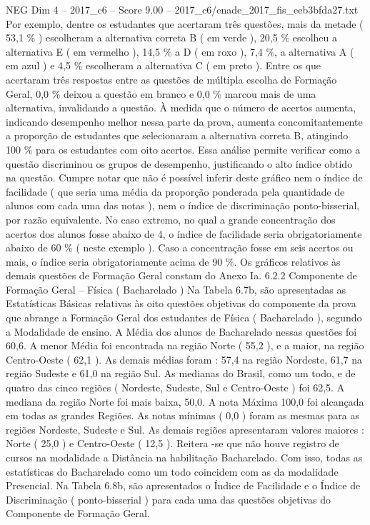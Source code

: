 \begin{textsample}{NEG Dim 4 – 2017\_c6 – Score 9.00 – 2017\_c6/enade\_2017\_fis\_eeb3bfda27.txt}
Por exemplo, dentre os estudantes que acertaram três questões, mais da metade ( 53,1 \% ) escolheram a alternativa correta B ( em verde ), 20,5 \% escolheu a alternativa E ( em vermelho ), 14,5 \% a D ( em roxo ), 7,4 \%, a alternativa A ( em azul ) e 4,5 \% escolheram a alternativa C ( em preto ).
Entre os que acertaram três respostas entre as questões de múltipla escolha de Formação Geral, 0,0 \% deixou a questão em branco e 0,0 \% marcou mais de uma alternativa, invalidando a questão.
À medida que o número de acertos aumenta, indicando desempenho melhor nessa parte da prova, aumenta concomitantemente a proporção de estudantes que selecionaram a alternativa correta B, atingindo 100 \% para os estudantes com oito acertos.
Essa análise permite verificar como a questão discriminou os grupos de desempenho, justificando o alto índice obtido na questão.
Cumpre notar que não é possível inferir deste gráfico nem o índice de facilidade ( que seria uma média da proporção ponderada pela quantidade de alunos com cada uma das notas ), nem o índice de discriminação ponto-bisserial, por razão equivalente.
No caso extremo, no qual a grande concentração dos acertos dos alunos fosse abaixo de 4, o índice de facilidade seria obrigatoriamente abaixo de 60 \% ( neste exemplo ).
Caso a concentração fosse em seis acertos ou mais, o índice seria obrigatoriamente acima de 90 \%.
Os gráficos relativos às demais questões de Formação Geral constam do Anexo Ia. 6.2.2 Componente de Formação Geral – Física ( Bacharelado ) Na Tabela 6.7b, são apresentadas as Estatísticas Básicas relativas às oito questões objetivas do componente da prova que abrange a Formação Geral dos estudantes de Física ( Bacharelado ), segundo a Modalidade de ensino.
A Média dos alunos de Bacharelado nessas questões foi 60,6.
A menor Média foi encontrada na região Norte ( 55,2 ), e a maior, na região Centro-Oeste ( 62,1 ).
As demais médias foram : 57,4 na região Nordeste, 61,7 na região Sudeste e 61,0 na região Sul.
As medianas do Brasil, como um todo, e de quatro das cinco regiões ( Nordeste, Sudeste, Sul e Centro-Oeste ) foi 62,5.
A mediana da região Norte foi mais baixa, 50,0.
A nota Máxima 100,0 foi alcançada em todas as grandes Regiões.
As notas mínimas ( 0,0 ) foram as mesmas para as regiões Nordeste, Sudeste e Sul.
As demais regiões apresentaram valores maiores : Norte ( 25,0 ) e Centro-Oeste ( 12,5 ).
Reitera -se que não houve registro de cursos na modalidade a Distância na habilitação Bacharelado.
Com isso, todas as estatísticas do Bacharelado como um todo coincidem com as da modalidade Presencial.
Na Tabela 6.8b, são apresentados o Índice de Facilidade e o Índice de Discriminação ( ponto-bisserial ) para cada uma das questões objetivas do Componente de Formação Geral.

\end{textsample}
